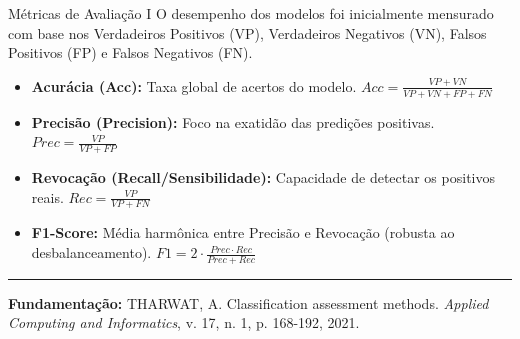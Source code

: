 \documentclass[aspectratio=169]{beamer}
\begin{document}
\begin{frame}{Métricas de Avaliação I}
    O desempenho dos modelos foi inicialmente mensurado com base nos Verdadeiros Positivos (VP), Verdadeiros Negativos (VN), Falsos Positivos (FP) e Falsos Negativos (FN).
    
    \vspace{0.2cm}
    \begin{itemize}
        \item \textbf{Acurácia (Acc):} Taxa global de acertos do modelo.
        $ Acc = \frac{VP + VN}{VP + VN + FP + FN} $
        
        \vspace{0.1cm}
        \item \textbf{Precisão (Precision):} Foco na exatidão das predições positivas.
        $ Prec = \frac{VP}{VP + FP} $
        
        \vspace{0.1cm}
        \item \textbf{Revocação (Recall/Sensibilidade):} Capacidade de detectar os positivos reais.
        $ Rec = \frac{VP}{VP + FN} $
        
        \vspace{0.1cm}
        \item \textbf{F1-Score:} Média harmônica entre Precisão e Revocação (robusta ao desbalanceamento).
        $ F1 = 2 \cdot \frac{Prec \cdot Rec}{Prec + Rec} $
    \end{itemize}
    
    \vfill
    \hrule
    \vspace{0.1cm}
    {\tiny \textbf{Fundamentação:} THARWAT, A. Classification assessment methods. \textit{Applied Computing and Informatics}, v. 17, n. 1, p. 168-192, 2021.}
\end{frame}
\end{document}
